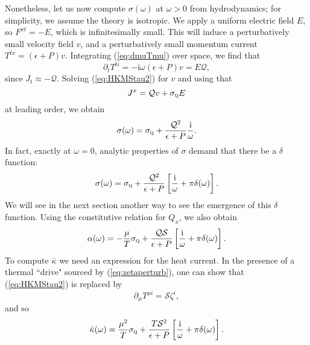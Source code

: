 \documentclass[10pt, oneside]{book}
\begin{document}
\begin{doublespace}
Nonetheless, let us now compute $\sigma(\omega)$ at $\omega>0$ from hydrodynamics;  for simplicity, we assume the theory is isotropic.   We apply a uniform electric field $E$, so $F^{xt} = -E$, which is infinitesimally small.   This will induce a perturbatively small velocity field $v$, and a perturbatively small momentum current $T^{tx} = (\epsilon+P)v$.
 Integrating (\ref{eq:dmuTmu}) over space, we find that \begin{equation}
\partial_t T^{ti} = -\mathrm{i}\omega (\epsilon+P)v = E\mathcal{Q},   \label{eq:HKMStau2}
\end{equation}since $J_t \approx -\mathcal{Q}$.   Solving (\ref{eq:HKMStau2}) for $v$ and using that \begin{equation}
J^x = \mathcal{Q}v + \sigma_{\textsc{q}}E
\end{equation}at leading order, we obtain \begin{equation}
\sigma(\omega) = \sigma_{\textsc{q}} + \frac{\mathcal{Q}^2}{\epsilon +P } \frac{\mathrm{i}}{\omega}.  \label{eq:Cleansigma}
\end{equation}
In fact, exactly at $\omega=0$, analytic properties of $\sigma$ demand that there be a $\delta$ function: \begin{equation}
\sigma(\omega) = \sigma_{\textsc{q}} + \frac{\mathcal{Q}^2}{\epsilon +P } \left[\frac{\mathrm{i}}{\omega} + \pi \delta(\omega)\right].   \label{eq:Cleansigma2}
\end{equation}
We will see in the next section another way to see the emergence of this $\delta$ function.
Using the constitutive relation for $Q_x$, we also obtain \begin{equation}
\alpha(\omega) = -\frac{\mu}{T} \sigma_{\textsc{q}}+ \frac{\mathcal{QS}}{\epsilon +P }  \left[\frac{\mathrm{i}}{\omega} + \pi \delta(\omega)\right].  \label{eq:hkmsalpha}
\end{equation}
To compute $\bar\kappa$ we need an expression for the heat current.   In the presence of a thermal ``drive" sourced by (\ref{eq:zetaperturb}), one can show that (\ref{eq:HKMStau2}) is replaced by \begin{equation}
\partial_\mu T^{\mu i} =  \mathcal{S}\zeta^i,
\end{equation}
and so \begin{equation}
\bar\kappa(\omega) = \frac{\mu^2}{T}\sigma_{\textsc{q}} + \frac{T\mathcal{S}^2}{\epsilon+P}  \left[\frac{\mathrm{i}}{\omega} + \pi \delta(\omega)\right].   \label{eq:hkmskappa}
\end{equation}


\end{doublespace}
\end{document}
